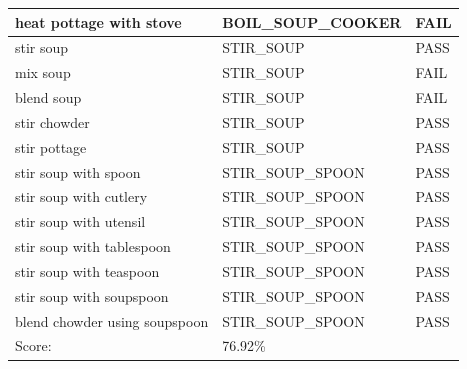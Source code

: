 \documentclass[11pt]{article}
\begin{document}
\begin{table}[H]
\begin{tabular}{lll}
\multicolumn{1}{l|}{heat pottage with stove}        & \multicolumn{1}{l|}{BOIL\_SOUP\_COOKER} & \cellcolor[HTML]{FD6864}FAIL \\ \hline
\multicolumn{1}{l|}{stir soup}                      & \multicolumn{1}{l|}{STIR\_SOUP}         & \cellcolor[HTML]{67FD9A}PASS \\ \hline
\multicolumn{1}{l|}{mix soup}                       & \multicolumn{1}{l|}{STIR\_SOUP}         & \cellcolor[HTML]{FD6864}FAIL \\ \hline
\multicolumn{1}{l|}{blend soup}                     & \multicolumn{1}{l|}{STIR\_SOUP}         & \cellcolor[HTML]{FD6864}FAIL \\ \hline
\multicolumn{1}{l|}{stir chowder}                   & \multicolumn{1}{l|}{STIR\_SOUP}         & \cellcolor[HTML]{67FD9A}PASS \\ \hline
\multicolumn{1}{l|}{stir pottage}                   & \multicolumn{1}{l|}{STIR\_SOUP}         & \cellcolor[HTML]{67FD9A}PASS \\ \hline
\multicolumn{1}{l|}{stir soup with spoon}           & \multicolumn{1}{l|}{STIR\_SOUP\_SPOON}  & \cellcolor[HTML]{67FD9A}PASS \\ \hline
\multicolumn{1}{l|}{stir soup with cutlery}         & \multicolumn{1}{l|}{STIR\_SOUP\_SPOON}  & \cellcolor[HTML]{67FD9A}PASS \\ \hline
\multicolumn{1}{l|}{stir soup with utensil}         & \multicolumn{1}{l|}{STIR\_SOUP\_SPOON}  & \cellcolor[HTML]{67FD9A}PASS \\ \hline
\multicolumn{1}{l|}{stir soup with tablespoon}      & \multicolumn{1}{l|}{STIR\_SOUP\_SPOON}  & \cellcolor[HTML]{67FD9A}PASS \\ \hline
\multicolumn{1}{l|}{stir soup with teaspoon}        & \multicolumn{1}{l|}{STIR\_SOUP\_SPOON}  & \cellcolor[HTML]{67FD9A}PASS \\ \hline
\multicolumn{1}{l|}{stir soup with soupspoon}       & \multicolumn{1}{l|}{STIR\_SOUP\_SPOON}  & \cellcolor[HTML]{67FD9A}PASS \\ \hline
\multicolumn{1}{l|}{blend chowder using soupspoon}  & \multicolumn{1}{l|}{STIR\_SOUP\_SPOON}  & \cellcolor[HTML]{67FD9A}PASS \\ \hline
\multicolumn{1}{l|}{Score:}                         & \multicolumn{1}{l|}{76.92\%}            &                              \\

\end{tabular}
\end{table}
\end{document}
